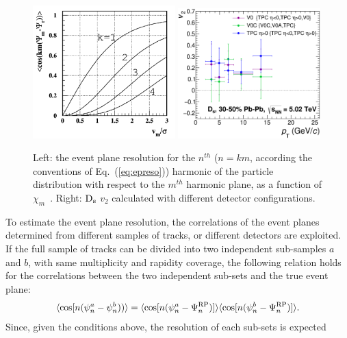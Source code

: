 \begin{figure}
\centering
 \includegraphics[width=0.49\textwidth]{FigCap5/resolBessel.png}
  \includegraphics[width=0.49\textwidth]{FigCap5/v2_diffDetComparison.eps}
 \caption{Left: the event plane resolution for the $n^{ th}$ ($n=km$, according the conventions of Eq.~(\ref{eq:epreso})) harmonic of the particle distribution with respect to the $m^{ th}$ harmonic plane, as a function of $\chi_m$~\cite{Poskanzer:1998yz}. Right: ${\rm D_s}$ $v_2$ calculated with different detector configurations. }
 \label{fig:resoBesselAndv2}
\end{figure}
To estimate the event plane resolution, the correlations of the event planes determined
from different samples of tracks, or different detectors are exploited.
If the full sample of tracks can be divided into two independent sub-samples 
$a$ and $b$, with same multiplicity and rapidity coverage,
the following relation holds for the correlations between the
two independent sub-sets and the true event plane:
\begin{equation}
\langle {\rm cos} [n({\rm \psi}^a_n-{\rm \psi}^b_n)) \rangle = 
\langle {\rm cos} [n({\rm \psi}^a_n-{\rm \Psi}_n^{\rm RP})] \rangle \langle {\rm cos} [n({\rm \psi}^b_n-{\rm \Psi}_n^{\rm RP})] \rangle .
\end{equation}
Since, given the conditions above, the resolution of each sub-sets is expected 
